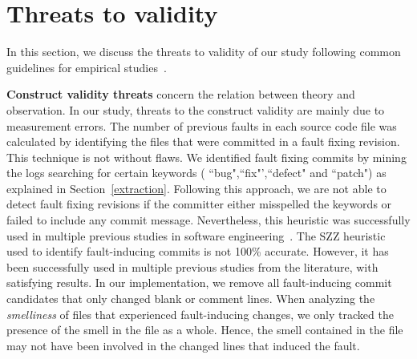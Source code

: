 \section{Threats to validity}\label{threats}

In this section, we discuss the threats to validity of our study following common guidelines for empirical studies~\cite{robert2002case}.

\textbf{Construct validity threats} concern the relation between theory and observation. In our study, threats to the construct validity are mainly due to measurement errors. %
The number of previous faults in each source code file was calculated by identifying the files that were committed in a fault fixing revision. This technique is not without flaws. We identified fault fixing commits by mining the logs searching for certain keywords (\ie{} ``bug",``fix"',``defect" and ``patch") as explained in Section~\ref{extraction}. Following this approach, we are not able to detect fault fixing revisions if the committer either misspelled the keywords or failed to include any commit message. Nevertheless, this heuristic was successfully used in multiple previous studies in software engineering~\cite{jaafar2013mining,shihab2013studying}. The SZZ heuristic used to identify fault-inducing commits is not 100\% accurate. However, it has been successfully used in multiple previous studies from the literature, with satisfying results. In our implementation, we remove all fault-inducing commit candidates that only changed blank or comment lines. When analyzing the \emph{smelliness} of files that experienced fault-inducing changes, we only tracked the presence of the smell in the file as a whole. Hence, the smell contained in the file may not have been involved in the changed lines that induced the fault. %


